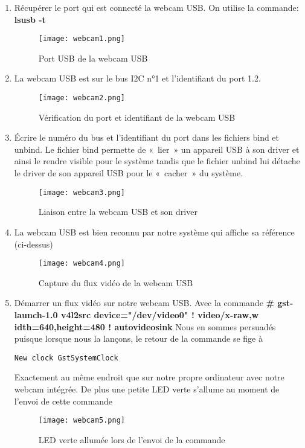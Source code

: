 \begin{enumerate}
  \item Récupérer le port qui est connecté la webcam USB. On utilise la commande:
  \textbf{lsusb -t}
\begin{figure}[th]
    \centering
    \texttt{[image: webcam1.png]}
    \decoRule
    \caption{Port USB de la webcam USB}  \label{fig:webcam1}
\end{figure}

\item La webcam USB est sur le bus I2C n°1 et l’identifiant du port 1.2.
\begin{figure}[th]
    \centering
    \texttt{[image: webcam2.png]}
    \decoRule
    \caption{Vérification du port et identifiant de la webcam USB}  \label{fig:webcam2}
\end{figure}

\item Écrire le numéro du bus et l’identifiant du port dans les fichiers bind
et unbind. Le fichier bind permette de  « lier » un appareil USB à son driver et
ainsi le rendre visible pour le système tandis que le fichier unbind lui détache
le driver de son appareil USB pour le « cacher » du système.
\begin{figure}[th]
    \centering
    \texttt{[image: webcam3.png]}
    \decoRule
    \caption{Liaison entre la webcam USB et son driver}  \label{fig:webcam3}
\end{figure}

\item La webcam USB est bien reconnu par notre système qui affiche sa
référence (ci-dessus)
\begin{figure}[th]
    \centering
    \texttt{[image: webcam4.png]}
    \decoRule
    \caption{Capture du flux vidéo de la webcam USB}  \label{fig:webcam4}
\end{figure}

\item Démarrer un flux vidéo sur notre webcam USB. Avec la commande
\textbf{\# gst-launch-1.0 v4l2src device="/dev/video0" ! video/x-raw,w
idth=640,height=480 ! autovideosink}
Nous en sommes persuadés puisque lorsque nous la lançons, le retour de la
commande se fige à
\begin{lstlisting}
New clock GstSystemClock
\end{lstlisting}
Exactement au même endroit que sur notre propre ordinateur avec notre webcam
intégrée. De plus une petite LED verte s’allume au moment de l’envoi de cette
commande
\begin{figure}[th]
    \centering
    \texttt{[image: webcam5.png]}
    \decoRule
    \caption{LED verte allumée lors de l'envoi de la commande}  \label{fig:webcam5}
\end{figure}

\end{enumerate}

